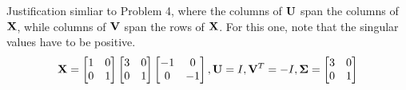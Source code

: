 \documentclass[a4paper, 12pt]{article}
\begin{document}
\begin{problem} [Problem 5]
\end{problem}
\begin{solution}
    Justification simliar to Problem 4, where the columns of $\mathbf{U}$ span the columns of $\mathbf{X}$, while columns of $\mathbf{V}$ span the rows of $\mathbf{X}$. For this one, note that the singular values have to be positive.
    \[
        \mathbf{X} = \begin{bmatrix}
            1 & 0 \\
            0 & 1
        \end{bmatrix}
        \begin{bmatrix}
            3 & 0 \\
            0 & 1
        \end{bmatrix}
        \begin{bmatrix}
            -1 & 0  \\
            0  & -1
        \end{bmatrix}, \mathbf{U} = I, \mathbf{V}^T = -I, \mathbf{\Sigma} = \begin{bmatrix}
            3 & 0 \\
            0 & 1
        \end{bmatrix}
    \]
\end{solution}
\end{document}
